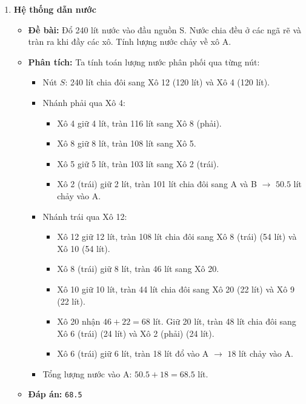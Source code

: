 \documentclass[11pt,a4paper]{article}
\begin{document}
\begin{enumerate}[label=\textbf{Câu \arabic*:}, leftmargin=*]
\hrule
\vspace{0.5cm}

\item \textbf{Hệ thống dẫn nước}
    \begin{itemize}
        \item \textbf{Đề bài:} Đổ 240 lít nước vào đầu nguồn S. Nước chia đều ở các ngã rẽ và tràn ra khi đầy các xô. Tính lượng nước chảy về xô A.
        \item \textbf{Phân tích:}
            Ta tính toán lượng nước phân phối qua từng nút:
            \begin{itemize}
                \item Nút $S$: 240 lít chia đôi sang Xô 12 (120 lít) và Xô 4 (120 lít).
                \item Nhánh phải qua Xô 4:
                    \begin{itemize}
                        \item Xô 4 giữ 4 lít, tràn 116 lít sang Xô 8 (phải).
                        \item Xô 8 giữ 8 lít, tràn 108 lít sang Xô 5.
                        \item Xô 5 giữ 5 lít, tràn 103 lít sang Xô 2 (trái).
                        \item Xô 2 (trái) giữ 2 lít, tràn 101 lít chia đôi sang A và B $\to$ $50.5$ lít chảy vào A.
                    \end{itemize}
                \item Nhánh trái qua Xô 12:
                    \begin{itemize}
                        \item Xô 12 giữ 12 lít, tràn 108 lít chia đôi sang Xô 8 (trái) (54 lít) và Xô 10 (54 lít).
                        \item Xô 8 (trái) giữ 8 lít, tràn 46 lít sang Xô 20.
                        \item Xô 10 giữ 10 lít, tràn 44 lít chia đôi sang Xô 20 (22 lít) và Xô 9 (22 lít).
                        \item Xô 20 nhận $46 + 22 = 68$ lít. Giữ 20 lít, tràn 48 lít chia đôi sang Xô 6 (trái) (24 lít) và Xô 2 (phải) (24 lít).
                        \item Xô 6 (trái) giữ 6 lít, tràn 18 lít đổ vào A $\to$ $18$ lít chảy vào A.
                    \end{itemize}
                \item Tổng lượng nước vào A: $50.5 + 18 = 68.5$ lít.
            \end{itemize}
        \item \textbf{Đáp án:} \texttt{68.5}
    \end{itemize}


\end{enumerate}
\end{document}
